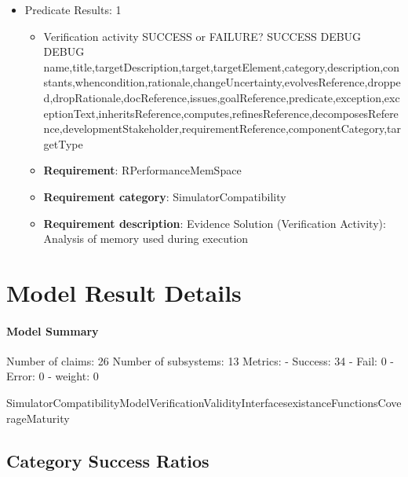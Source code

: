 \documentclass{article}
\begin{document}
\begin{itemize}
									    
				\item Predicate Results: 1
					\begin{itemize}				
					\item Verification activity SUCCESS or FAILURE? SUCCESS
					DEBUG DEBUG name,title,targetDescription,target,targetElement,category,description,constants,whencondition,rationale,changeUncertainty,evolvesReference,dropped,dropRationale,docReference,issues,goalReference,predicate,exception,exceptionText,inheritsReference,computes,refinesReference,decomposesReference,developmentStakeholder,requirementReference,componentCategory,targetType
					\item \textbf{Requirement}: RPerformanceMemSpace 
					\item \textbf{Requirement category}: SimulatorCompatibility
					\item \textbf{Requirement description}: Evidence Solution (Verification Activity): Analysis of memory used during execution
					\end{itemize}

			\end{itemize}

			\section{Model Result Details} 
			\paragraph{Model Summary}
			Number of claims: 26
			Number of subsystems: 13
			Metrics:
			- Success: 34
			- Fail: 0
			- Error: 0
			- weight: 0
			
			SimulatorCompatibilityModelVerificationValidityInterfacesexistanceFunctionsCoverageMaturity

					\subsection{Category Success Ratios}
						
\end{document}

